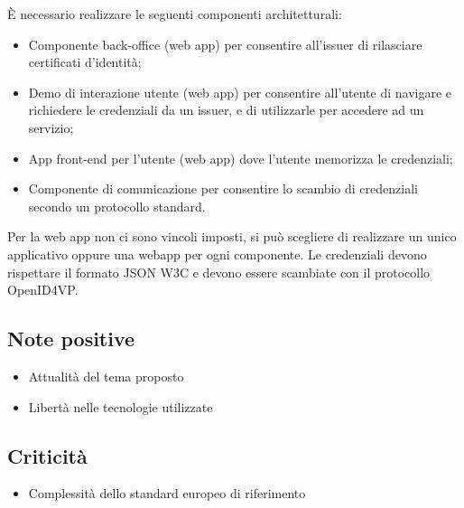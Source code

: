 È necessario realizzare le seguenti componenti architetturali:
\begin{itemize}
    \item Componente back-office (web app) per consentire all’issuer di rilasciare certificati d'identità;
    \item Demo di interazione utente (web app) per consentire all’utente di navigare e richiedere le credenziali da un issuer, e di utilizzarle per accedere ad un servizio;
    \item App front-end per l’utente (web app) dove l’utente memorizza le credenziali;
    \item Componente di comunicazione per consentire lo scambio di credenziali secondo un protocollo standard.
\end{itemize}
Per la web app non ci sono vincoli imposti, si può scegliere di realizzare un unico applicativo oppure una webapp per ogni componente.
Le credenziali devono rispettare il formato JSON W3C e devono essere scambiate con il
protocollo OpenID4VP.

\subsection*{Note positive}
\begin{itemize}
    \item Attualità del tema proposto
    \item Libertà nelle tecnologie utilizzate
\end{itemize}
\subsection*{Criticità}
\begin{itemize}
    \item Complessità dello standard europeo di riferimento
\end{itemize}

